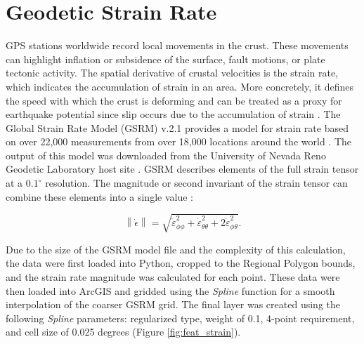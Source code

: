 \section{Geodetic Strain Rate}\label{app:dl_strain_rate}
GPS stations worldwide record local movements in the crust. These movements can highlight inflation or subsidence of the surface, fault motions, or plate tectonic activity. The spatial derivative of crustal velocities is the strain rate, which indicates the accumulation of strain in an area. More concretely, it defines the speed with which the crust is deforming and can be treated as a proxy for earthquake potential since slip occurs due to the accumulation of strain \citep{gem_strain_2014}. The Global Strain Rate Model (GSRM) v.2.1 provides a model for strain rate based on over 22,000 measurements from over 18,000 locations around the world \citep{kreemer_geodetic_2014}. The output of this model was downloaded from the University of Nevada Reno Geodetic Laboratory host site \citep{kreemer_global_2020}. GSRM describes elements of the full strain tensor at a $0.1^\circ$ resolution. The magnitude or second invariant of the strain tensor can combine these elements into a single value \citep{kreemer_geodetic_2014}:

\begin{equation}\label{eq:strainratemagnitude}
\left\lVert\dot{\epsilon}\right\rVert = \sqrt{\dot{\varepsilon}_{\phi\phi}^2+\dot{\varepsilon}_{\theta\theta}^2+2\dot{\varepsilon}_{\phi\theta}^2}.
\end{equation}

Due to the size of the GSRM model file and the complexity of this calculation, the data were first loaded into Python, cropped to the Regional Polygon bounds, and the strain rate magnitude was calculated for each point. These data were then loaded into ArcGIS and gridded using the \textit{Spline} function for a smooth interpolation of the coarser GSRM grid. The final layer  was created using the following \textit{Spline} parameters: regularized type, weight of 0.1, 4-point requirement, and cell size of 0.025 degrees (Figure \ref{fig:feat_strain}).
\vfill
\pagebreak

